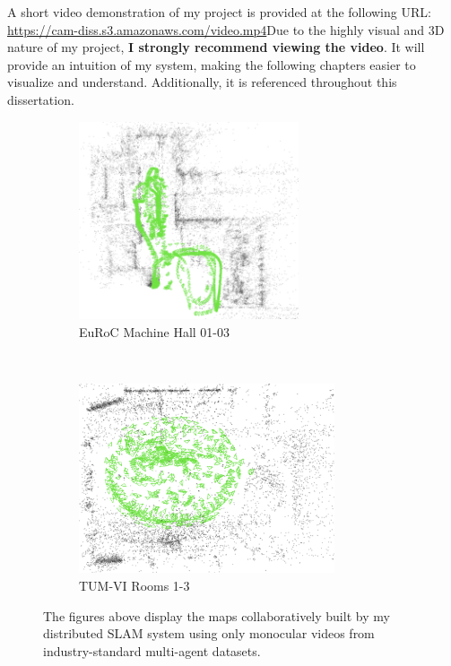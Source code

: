 \begin{leftbar}
    A short video demonstration of my project is provided at the following URL:\\ \url{https://cam-diss.s3.amazonaws.com/video.mp4}\captionbreak Due to the highly visual and 3D nature of my project, \textbf{I strongly recommend viewing the video}. It will provide an intuition of my system, making the following chapters easier to visualize and understand. Additionally, it is referenced throughout this dissertation.
\end{leftbar}

\begin{figure}[h]
    \centering
    \captionsetup{format=plain, labelformat=empty, font=normalsize}
    \begin{subfigure}[t]{0.475\linewidth}
        \centering
        \includegraphics[height=2.3in]{figures/euroc_mh_map.png}
        \caption{EuRoC Machine Hall 01-03}
    \end{subfigure}\hfill%
    ~
    \begin{subfigure}[t]{0.475\linewidth}
        \centering
        \includegraphics[height=2.2in]{figures/tum_room_map.png}
        \caption{TUM-VI Rooms 1-3}
    \end{subfigure}

    \caption{The figures above display the maps collaboratively built by my distributed SLAM system using only monocular videos from industry-standard multi-agent datasets.}
    \label{fig:example-maps}
\end{figure}
